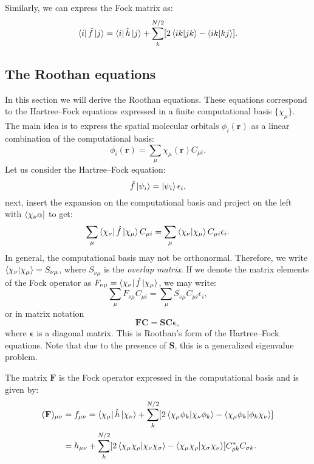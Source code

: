 \documentclass[../Main/chem532-notes.tex]{subfiles}
\begin{document}
Similarly, we can express the Fock matrix as:
\begin{equation}
\bra{i}\hat{f}\ket{j} = \bra{i}\hat{h}\ket{j} + \sum_{k}^{N/2} [ 2 \braket{ik|jk} - \braket{ik|kj} ].
\end{equation}

\subsection{The Roothan equations}
In this section we will derive the Roothan equations.
These equations correspond to the Hartree--Fock equations expressed in a finite computational basis $\{ \chi_\mu \}$.
The main idea is to express the spatial molecular orbitals $\phi_i(\mathbf{r})$ as a linear combination of the computational basis:
\begin{equation}
\phi_i(\mathbf{r}) = \sum_{\mu} \chi_\mu(\mathbf{r}) C_{\mu i}.
\end{equation}
Let us consider the Hartree--Fock equation:
\begin{equation}
\hat{f} \ket{\psi_i} = \ket{\psi_i} \epsilon_i,
\end{equation}
next, insert the expansion on the computational basis and project on the left with $\bra{\chi_{\nu} \alpha}$ to get:
\begin{equation}
 \sum_{\mu} \bra{\chi_{\nu}}\hat{f} \ket{\chi_\mu} C_{\mu i} = \sum_{\mu} \braket{\chi_{\nu}|\chi_\mu} C_{\mu i} \epsilon_i.
\end{equation}
In general, the computational basis may not be orthonormal. Therefore, we write $\braket{\chi_{\nu}|\chi_\mu} = S_{\nu \mu}$, where $S_{\nu \mu}$ is the \textit{overlap matrix}.
If we denote the matrix elements of the Fock operator as $F_{\nu\mu}=\bra{\chi_{\nu}}\hat{f}\ket{\chi_\mu}$, we may write:
\begin{equation}
 \sum_{\mu} F_{\nu\mu} C_{\mu i} = \sum_{\mu} S_{\nu \mu} C_{\mu i} \epsilon_i,
\end{equation}
or in matrix notation
\begin{equation}
 \mathbf{F}\mathbf{C} = \mathbf{S}\mathbf{C}\boldsymbol{\epsilon},
\end{equation}
where $\boldsymbol{\epsilon}$ is a diagonal matrix.
This is Roothan's form of the Hartree--Fock equations.
Note that due to the presence of $\mathbf{S}$, this is a generalized eigenvalue problem.

The matrix $\mathbf{F}$ is the Fock operator expressed in the computational basis and is given by:
\begin{equation}
\begin{split}
(\mathbf{F})_{\mu\nu} &= f_{\mu\nu}
= \bra{\chi_\mu} \hat{h} \ket{\chi_\nu}
+ \sum_k^{N/2} [ 2 \braket{\chi_\mu \phi_k|\chi_\nu \phi_k}
- \braket{\chi_\mu \phi_k|\phi_k \chi_\nu}] \\
&= h_{\mu\nu}
+ \sum_k^{N/2} [ 2 \braket{\chi_\mu \chi_\rho|\chi_\nu \chi_\sigma} 
- \braket{\chi_\mu \chi_\rho|\chi_\sigma \chi_\nu }] C_{\rho k}^* C_{\sigma k}.
\end{split}
\end{equation}
\end{document}
